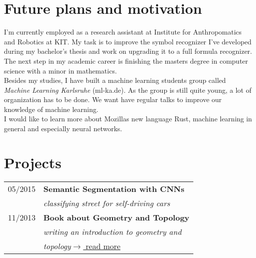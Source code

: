 \documentclass[a4paper,10pt]{article} %
\begin{document}
{\begin{minipage}[t]{0.5\textwidth}
\section{Future plans and motivation}

I'm currently employed as a research assistant at Institute for Anthropomatics
and Robotics at KIT. My task is to improve the symbol recognizer I've developed
during my bachelor's thesis and work on upgrading it to a full formula
recognizer.\\

The next step in my academic career is finishing the masters degree in computer
science with a minor in mathematics.\\

Besides my studies, I have built a machine learning students group called
\textit{Machine Learning Karlsruhe} (ml-ka.de). As the group is still quite
young, a lot of organization has to be done. We want have regular talks to
improve our knowledge of machine learning.\\

I would like to learn more about Mozillas new language Rust, machine learning
in general and especially neural networks.



\end{minipage} %
\hfill
\begin{minipage}[t]{0.44\textwidth}
\vspace{0pt} %


\section{Projects}

\begin{tabular}{rl}
05/2015  & \textbf{Semantic Segmentation with CNNs}\\
& \textit{classifying street for self-driving cars}\\

11/2013  & \textbf{Book about Geometry and Topology}\\
& \textit{writing an introduction to geometry and}\\
& \textit{topology}\hfill \href{http://martin-thoma.com/geotopo/}{$\rightarrow$ read more}\\


\end{tabular}
\end{minipage}}
\end{document}
